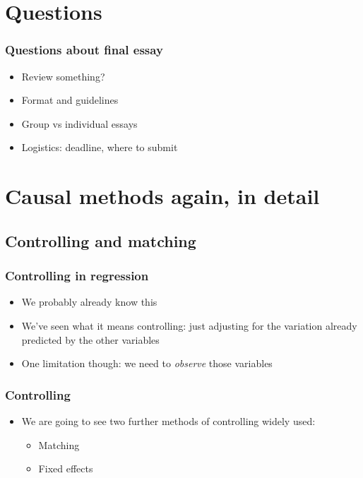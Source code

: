 \documentclass[aspectratio=43]{beamer}
\begin{document}
\section{Questions}

\begin{frame}
\frametitle{Questions about final essay}
\centering

\begin{itemize}
  \item Review something?
  \item Format and guidelines
  \item Group vs individual essays
  \item Logistics: deadline, where to submit
\end{itemize}

\end{frame}


\section{Causal methods again, in detail}


\subsection*{Controlling and matching}

\begin{frame}
\frametitle{Controlling in regression}
\centering

\begin{itemize}
  \item We probably already know this
  \item We've seen what it means controlling: just adjusting for the variation already predicted by the other variables
  \item One limitation though: we need to \textit{observe} those variables
\end{itemize}

\end{frame}

\begin{frame}
\frametitle{Controlling}
\centering

\begin{itemize}
  \item We are going to see two further methods of controlling widely used:
  \begin{itemize}
    \item Matching
    \item Fixed effects
  \end{itemize}
\end{itemize}

\end{frame}
\end{document}
